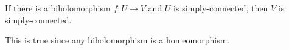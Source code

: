 \documentclass{homework}
\begin{document}
                                                                                                                                                                                                                                                \begin{problem}
                                                                                                                                                                                                                                                  If there is a biholomorphism $f : U \to V$ and $U$ is
                                                                                                                                                                                                                                                    simply-connected, then $V$ is simply-connected.
                                                                                                                                                                                                                                                    \end{problem}
                                                                                                                                                                                                                                                    \begin{solution}
                                                                                                                                                                                                                                                    This is true since any biholomorphism is a homeomorphism.
                                                                                                                                                                                                                                                    \end{solution}
                                                                                                                                                                                                                                                    
\end{document}
